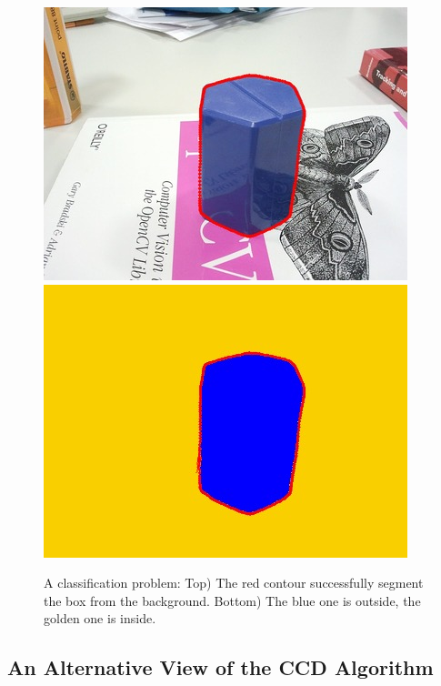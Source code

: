 \documentclass[conference]{IEEEtran}
\begin{document}
\begin{figure}[htbp]
  \centering
  \includegraphics[width=\columnwidth]{images/divide1.jpg}\\
  \includegraphics[width=\columnwidth]{images/divide2.jpg}
  \caption[A classification problem]{A classification problem: Top) The red
    contour successfully segment the box from the background. Bottom) The
    blue one is outside, the golden one is inside.}
  \label{fig:divide}
\end{figure}

\subsection{An Alternative View of the CCD Algorithm}
\label{sec:overview}
\end{document}
